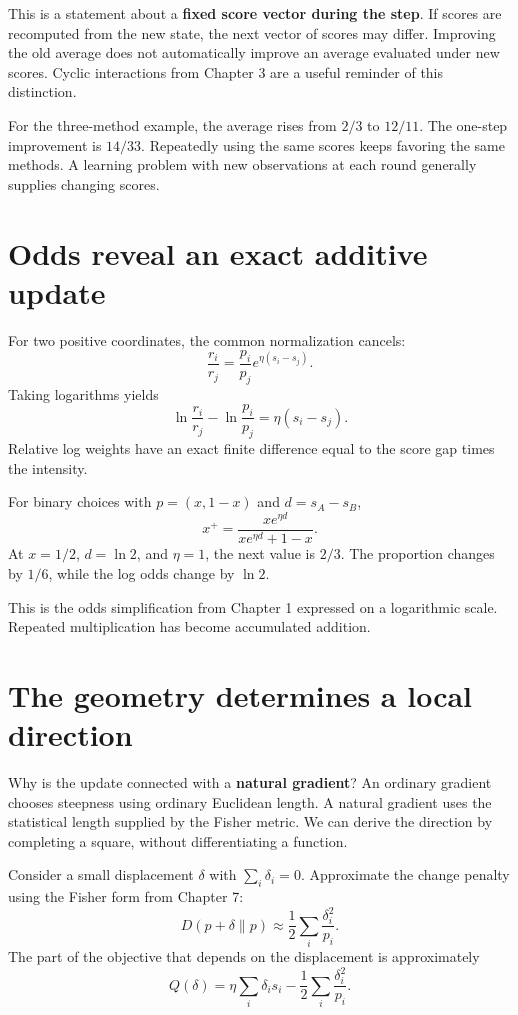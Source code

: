 \documentclass[11pt,oneside,openany]{book}
\theoremstyle{definition}
\theoremstyle{remark}
\numberwithin{equation}{chapter}
\begin{document}
This is a statement about a \textbf{fixed score vector during the step}. If scores are recomputed from the new state, the next vector of scores may differ. Improving the old average does not automatically improve an average evaluated under new scores. Cyclic interactions from Chapter 3 are a useful reminder of this distinction.

For the three-method example, the average rises from \(2/3\) to \(12/11\). The one-step improvement is \(14/33\). Repeatedly using the same scores keeps favoring the same methods. A learning problem with new observations at each round generally supplies changing scores.

\section{Odds reveal an exact additive update}\label{ch09-odds-reveal-an-exact-additive-update}

For two positive coordinates, the common normalization cancels: \[\frac{r_i}{r_j}=\frac{p_i}{p_j}e^{\eta(s_i-s_j)}.\] Taking logarithms yields \[\boxed{\ln\frac{r_i}{r_j}-\ln\frac{p_i}{p_j}
=\eta(s_i-s_j).}\] Relative log weights have an exact finite difference equal to the score gap times the intensity.

For binary choices with \(p=(x,1-x)\) and \(d=s_A-s_B\), \[x^+=\frac{xe^{\eta d}}{xe^{\eta d}+1-x}.\] At \(x=1/2\), \(d=\ln2\), and \(\eta=1\), the next value is \(2/3\). The proportion changes by \(1/6\), while the log odds change by \(\ln2\).

This is the odds simplification from Chapter 1 expressed on a logarithmic scale. Repeated multiplication has become accumulated addition.

\section{The geometry determines a local direction}\label{ch09-the-geometry-determines-a-local-direction}

Why is the update connected with a \textbf{natural gradient}? An ordinary gradient chooses steepness using ordinary Euclidean length. A natural gradient uses the statistical length supplied by the Fisher metric. We can derive the direction by completing a square, without differentiating a function.

Consider a small displacement \(\delta\) with \(\sum_i\delta_i=0\). Approximate the change penalty using the Fisher form from Chapter 7: \[D(p+\delta\|p)\approx\frac12\sum_i\frac{\delta_i^2}{p_i}.\] The part of the objective that depends on the displacement is approximately \[Q(\delta)=\eta\sum_i\delta_i s_i-\frac12\sum_i\frac{\delta_i^2}{p_i}.\]
\end{document}
